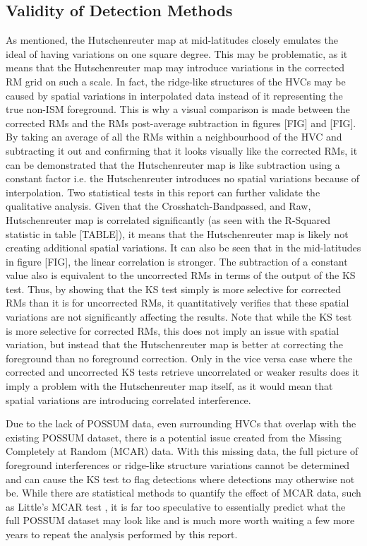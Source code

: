 \subsection{Validity of Detection Methods}
\label{ssec:B5}

As mentioned, the Hutschenreuter map at mid-latitudes closely emulates the ideal of having variations on one square degree.  This may be problematic, as it means that the Hutschenreuter map may introduce variations in the corrected RM grid on such a scale. In fact, the ridge-like structures of the HVCs may be caused by spatial variations in interpolated data instead of it representing the true non-ISM foreground. This is why a visual comparison is made between the corrected RMs and the RMs post-average subtraction in figures [FIG] and [FIG]. By taking an average of all the RMs within a neighbourhood of the HVC and subtracting it out and confirming that it looks visually like the corrected RMs, it can be demonstrated that the Hutschenreuter map is like subtraction using a constant factor i.e. the Hutschenreuter introduces no spatial variations because of interpolation. Two statistical tests in this report can further validate the qualitative analysis. Given that the Crosshatch-Bandpassed, and Raw, Hutschenreuter map is correlated significantly (as seen with the R-Squared statistic in table [TABLE]), it means that the Hutschenreuter map is likely not creating additional spatial variations. It can also be seen that in the mid-latitudes in figure [FIG], the linear correlation is stronger. The subtraction of a constant value also is equivalent to the uncorrected RMs in terms of the output of the KS test. Thus, by showing that the KS test simply is more selective for corrected RMs than it is for uncorrected RMs, it quantitatively verifies that these spatial variations are not significantly affecting the results. Note that while the KS test is more selective for corrected RMs, this does not imply an issue with spatial variation, but instead that the Hutschenreuter map is better at correcting the foreground than no foreground correction. Only in the vice versa case where the corrected and uncorrected KS tests retrieve uncorrelated or weaker results does it imply a problem with the Hutschenreuter map itself, as it would mean that spatial variations are introducing correlated interference.


Due to the lack of POSSUM data, even surrounding HVCs that overlap with the existing POSSUM dataset, there is a potential issue created from the Missing Completely at Random (MCAR) data. With this missing data, the full picture of foreground interferences or ridge-like structure variations cannot be determined and can cause the KS test to flag detections where detections may otherwise not be. While there are statistical methods to quantify the effect of MCAR data, such as Little's MCAR test \citep{ID72}, it is far too speculative to essentially predict what the full POSSUM dataset may look like and is much more worth waiting a few more years to repeat the analysis performed by this report.


